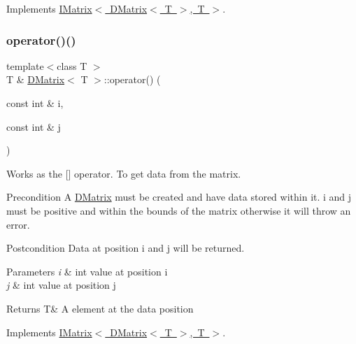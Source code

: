 Implements \mbox{\hyperlink{class_i_matrix_a10121e038635bdf33552c6a1fb288398}{I\+Matrix$<$ D\+Matrix$<$ T $>$, T $>$}}.

\mbox{\label{class_d_matrix_a4dc37695c56a6c4917159877d2aa3d81}} 
\subsubsection{\texorpdfstring{operator()()}{operator()()}\hspace{0.1cm}{\footnotesize\ttfamily [1/2]}}
{\footnotesize\ttfamily template$<$class T $>$ \\
T \& \mbox{\hyperlink{class_d_matrix}{D\+Matrix}}$<$ T $>$\+::operator() (\begin{DoxyParamCaption}\item[{const int \&}]{i,  }\item[{const int \&}]{j }\end{DoxyParamCaption})\hspace{0.3cm}{\ttfamily [virtual]}}



Works as the \mbox{[}\mbox{]} operator. To get data from the matrix. 

\begin{DoxyPrecond}{Precondition}
A \mbox{\hyperlink{class_d_matrix}{D\+Matrix}} must be created and have data stored within it. i and j must be positive and within the bounds of the matrix otherwise it will throw an error. 
\end{DoxyPrecond}
\begin{DoxyPostcond}{Postcondition}
Data at position i and j will be returned.
\end{DoxyPostcond}

\begin{DoxyParams}{Parameters}
{\em i} & int value at position i \\
\hline
{\em j} & int value at position j \\
\hline
\end{DoxyParams}
\begin{DoxyReturn}{Returns}
T\& A element at the data position 
\end{DoxyReturn}


Implements \mbox{\hyperlink{class_i_matrix_a1e4246d163aaca1b224dec8839645ea9}{I\+Matrix$<$ D\+Matrix$<$ T $>$, T $>$}}.

